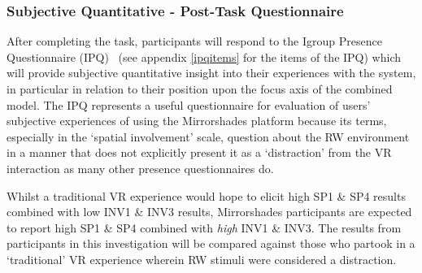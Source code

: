 \subsubsection{Subjective Quantitative - Post-Task Questionnaire}
After completing the task, participants will respond to the Igroup Presence Questionnaire (IPQ)~\cite{Schubert2001} (see appendix \ref{ipqitems} for the items of the IPQ) which will provide subjective quantitative insight into their experiences with the system, in particular in relation to their position upon the focus axis of the combined model. The IPQ represents a useful questionnaire for evaluation of users' subjective experiences of using the Mirrorshades platform because its terms, especially in the `spatial involvement' scale, question about the RW environment in a manner that does not explicitly present it as a `distraction' from the VR interaction as many other presence questionnaires do.


Whilst a traditional VR experience would hope to elicit high SP1 \& SP4 results combined with low INV1 \& INV3 results, Mirrorshades participants are expected to report high SP1 \& SP4 combined with \textit{high} INV1 \& INV3. The results from participants in this investigation will be compared against those who partook in a `traditional' VR experience wherein RW stimuli were considered a distraction.


